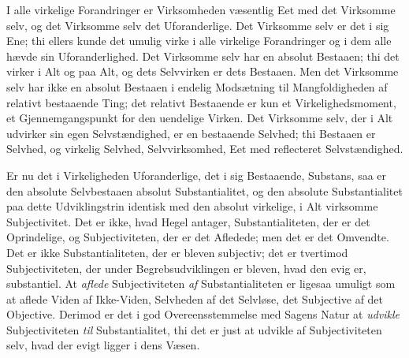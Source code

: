 \documentclass[11pt]{book}
\newcommand{\opage}[1]{\marginnote{\footnotesize\textit{[#1]}}}
\begin{document}
I alle virkelige Forandringer er Virksomheden væsentlig Eet med det
Virksomme selv, og det Virksomme selv det Uforanderlige. Det
Virksomme selv er det i sig Ene; thi ellers kunde det umulig virke
i alle virkelige Forandringer og i dem alle hævde sin
Uforanderlighed. Det Virksomme selv har en absolut Bestaaen; thi
det virker i Alt og paa Alt, og dets Selvvirken er dets Bestaaen.
Men det Virksomme selv har ikke en absolut Bestaaen i endelig
Modsætning til Mangfoldigheden af relativt bestaaende Ting; det
relativt Bestaaende er kun et Virkelighedsmoment, et
Gjennemgangspunkt for den
\opage{110} \setcounter{footnote}{0}%
uendelige Virken. Det Virksomme selv, der i Alt udvirker sin egen
Selvstændighed, er en bestaaende Selvhed; thi Bestaaen er Selvhed, og
virkelig Selvhed, Selvvirksomhed, Eet med reflecteret Selvstændighed.

Er nu det i Virkeligheden Uforanderlige, det i sig Bestaaende, Substans,
saa er den absolute Selvbestaaen absolut Substantialitet, og den absolute
Substantialitet paa dette Udviklingstrin identisk med den absolut
virkelige, i Alt virksomme Subjectivitet. Det er ikke, hvad Hegel
antager, Substantialiteten, der er det Oprindelige, og Subjectiviteten,
der er det Afledede; men det er det Omvendte. Det er ikke
Substantialiteten, der er bleven subjectiv; det er tvertimod
Subjectiviteten, der under Begrebsudviklingen er bleven, hvad den evig
er, substantiel. At \emph{aflede} Subjectiviteten \emph{af}
Substantialiteten er ligesaa umuligt som at aflede Viden af Ikke-Viden,
Selvheden af det Selvløse, det Subjective af det Objective. Derimod er
det i god Overeensstemmelse med Sagens Natur at \emph{udvikle}
Subjectiviteten \emph{til} Substantialitet, thi det er just at udvikle af
Subjectiviteten selv, hvad der evigt ligger i dens Væsen.
\end{document}
